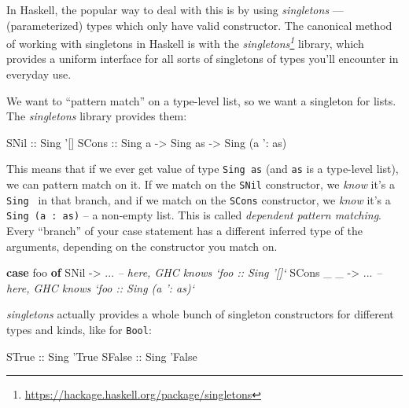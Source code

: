 \documentclass[]{article}
\newenvironment{Shaded}{}{}
\newcommand{\KeywordTok}[1]{\textcolor[rgb]{0.00,0.44,0.13}{\textbf{#1}}}
\newcommand{\DataTypeTok}[1]{\textcolor[rgb]{0.56,0.13,0.00}{#1}}
\newcommand{\CharTok}[1]{\textcolor[rgb]{0.25,0.44,0.63}{#1}}
\newcommand{\CommentTok}[1]{\textcolor[rgb]{0.38,0.63,0.69}{\textit{#1}}}
\newcommand{\OtherTok}[1]{\textcolor[rgb]{0.00,0.44,0.13}{#1}}
\newcommand{\FunctionTok}[1]{\textcolor[rgb]{0.02,0.16,0.49}{#1}}
\newcommand{\NormalTok}[1]{#1}
\renewcommand{\href}[2]{#2\footnote{\url{#1}}}
\begin{document}
In Haskell, the popular way to deal with this is by using \emph{singletons} ---
(parameterized) types which only have valid constructor. The canonical method of
working with singletons in Haskell is with the
\emph{\href{https://hackage.haskell.org/package/singletons}{singletons}}
library, which provides a uniform interface for all sorts of singletons of types
you'll encounter in everyday use.

We want to ``pattern match'' on a type-level list, so we want a singleton for
lists. The \emph{singletons} library provides them:

\begin{Shaded}
\begin{Highlighting}[]
\DataTypeTok{SNil}\OtherTok{  ::} \DataTypeTok{Sing} \CharTok{'[]}
\DataTypeTok{SCons}\OtherTok{ ::} \DataTypeTok{Sing}\NormalTok{ a }\OtherTok{->} \DataTypeTok{Sing}\NormalTok{ as }\OtherTok{->} \DataTypeTok{Sing}\NormalTok{ (a }\CharTok{': as)}
\end{Highlighting}
\end{Shaded}

This means that if we ever get value of type \texttt{Sing\ as} (and \texttt{as}
is a type-level list), we can pattern match on it. If we match on the
\texttt{SNil} constructor, we \emph{know} it's a
\texttt{Sing\ \textquotesingle{}{[}{]}} in that branch, and if we match on the
\texttt{SCons} constructor, we \emph{know} it's a
\texttt{Sing\ (a\ \textquotesingle{}:\ as)} -- a non-empty list. This is called
\emph{dependent pattern matching}. Every ``branch'' of your case statement has a
different inferred type of the arguments, depending on the constructor you match
on.

\begin{Shaded}
\begin{Highlighting}[]
\KeywordTok{case}\NormalTok{ foo }\KeywordTok{of}
  \DataTypeTok{SNil}      \OtherTok{->} \FunctionTok{...}   \CommentTok{-- here, GHC knows `foo :: Sing '[]`}
  \DataTypeTok{SCons}\NormalTok{ _ _ }\OtherTok{->} \FunctionTok{...}   \CommentTok{-- here, GHC knows `foo :: Sing (a ': as)`}
\end{Highlighting}
\end{Shaded}

\emph{singletons} actually provides a whole bunch of singleton constructors for
different types and kinds, like for \texttt{Bool}:

\begin{Shaded}
\begin{Highlighting}[]
\DataTypeTok{STrue}\OtherTok{  ::} \DataTypeTok{Sing} \CharTok{'True}
\DataTypeTok{SFalse}\OtherTok{ ::} \DataTypeTok{Sing} \CharTok{'False}
\end{Highlighting}
\end{Shaded}
\end{document}
